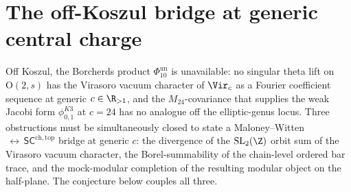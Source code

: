 \section{The off-Koszul bridge at generic central charge}
\label{sec:3dg-off-koszul-bridge}
%
%
%
%
%

Off Koszul, the Borcherds product $\Phi_{10}^{\mathrm{un}}$ is unavailable: no
singular theta lift on $\mathrm{O}(2,s)$ has the Virasoro vacuum
character of $\Vir_{c}$ as a Fourier coefficient sequence at generic
$c \in \R_{> 1}$, and the $M_{24}$-covariance that supplies the weak
Jacobi form $\phi_{0,1}^{K3}$ at $c = 24$ has no analogue off the
elliptic-genus locus. Three obstructions must be simultaneously
closed to state a Maloney--Witten$\,\leftrightarrow\,
\mathsf{SC}^{\mathrm{ch,top}}$ bridge at generic $c$: the divergence
of the $\mathrm{SL}_{2}(\Z)$ orbit sum of the Virasoro vacuum
character, the Borel-summability of the chain-level ordered bar
trace, and the mock-modular completion of the resulting modular
object on the half-plane. The conjecture below couples all three.

